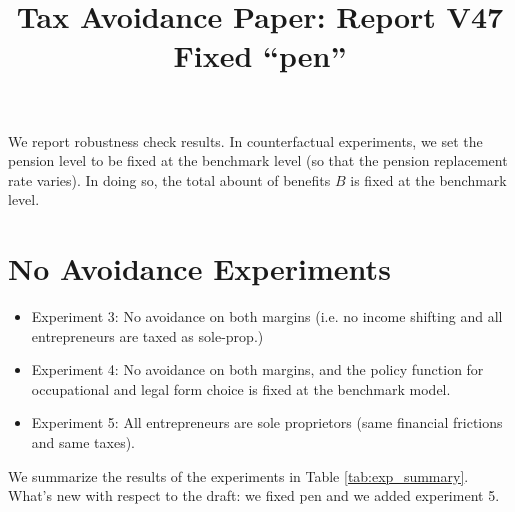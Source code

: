 \documentclass[11pt,english]{article}
\begin{document}
\title{Tax Avoidance Paper: Report V47 Fixed ``pen''}
\maketitle

We report robustness check results. In counterfactual experiments, we set the pension level to be fixed at the benchmark level (so that the pension replacement rate varies). In doing so, the total abount of benefits $B$ is fixed at the benchmark level.
\section{No Avoidance Experiments \label{sec:exp}}

\begin{itemize}
\item Experiment 3: No avoidance on both margins (i.e. no income shifting and all entrepreneurs are taxed as sole-prop.)
\item Experiment 4: No avoidance on both margins, and the policy function for occupational and legal form choice is fixed at the benchmark model.
\item Experiment 5: All entrepreneurs are sole proprietors (same financial frictions and same taxes).
\end{itemize}

We summarize the results of the experiments in Table \ref{tab:exp_summary}. What's new with respect to the draft: we fixed pen and we added experiment 5.
\end{document}
